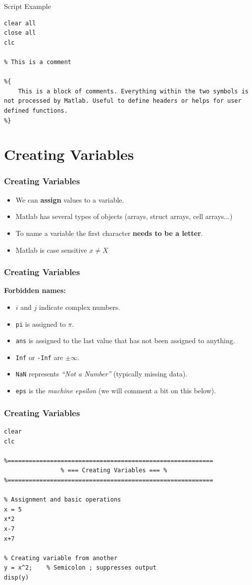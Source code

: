 \documentclass[11pt,xcolor={svgnames},aspectratio=169,usepdftitle=false]{beamer}
\begin{document}
\begin{frame}[fragile]{Script Example}
\begin{lstlisting}
clear all
close all 
clc

% This is a comment

%{
    This is a block of comments. Everything within the two symbols is not processed by Matlab. Useful to define headers or helps for user defined functions.
%}
\end{lstlisting}
\end{frame}

\section{Creating Variables}

\begin{frame}
    \frametitle{Creating Variables}
    \begin{itemize}
        \item We can \alert{\textbf{assign}} values to a variable.
        \item Matlab has several types of objects (arrays, struct arrays, cell arrays...)
        \item To name a variable the first character \alert{\textbf{needs to be a letter}}.
        \item Matlab is case sensitive $x \neq X$
    \end{itemize}
\end{frame}

\begin{frame}[fragile]
    \frametitle{Creating Variables}
\alert{\textbf{Forbidden names:}}
\begin{itemize}
	\item $i$ and $j$ indicate complex numbers.
	\item \verb;pi; is assigned to $\pi$.
	\item \verb;ans; is assigned to the last value that has not been assigned to anything.
	\item \verb;Inf; or \verb;-Inf; are $\pm\infty$.
	\item \verb;NaN; represents \textit{``Not a Number''} (typically missing data).
	\item \verb;eps; is the \textit{machine epsilon} (we will comment a bit on this below).
\end{itemize}
\end{frame}

\begin{frame}[fragile]
    \frametitle{Creating Variables}
\begin{lstlisting}
clear
clc

%==========================================================
                % === Creating Variables === %
%==========================================================

% Assignment and basic operations
x = 5
x*2
x-7
x+7

% Creating variable from another
y = x^2;    % Semicolon ; suppresses output
disp(y)
\end{lstlisting}
\end{frame}
\end{document}
